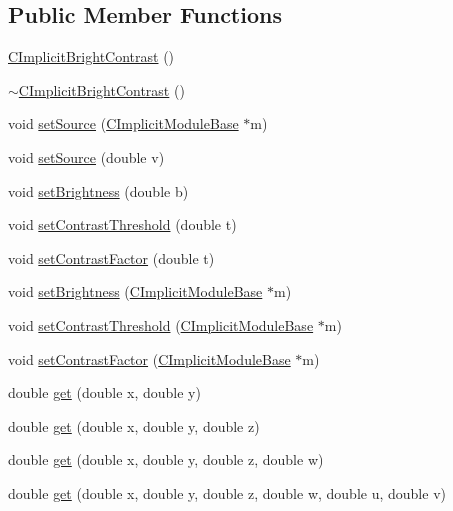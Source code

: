 \subsection*{Public Member Functions}
\begin{DoxyCompactItemize}
\item 
\hyperlink{classanl_1_1CImplicitBrightContrast_abc96d388571ee3f9cd77aeb5a9988661}{CImplicitBrightContrast} ()
\item 
\hyperlink{classanl_1_1CImplicitBrightContrast_aaa74e84e46905bb5eb1c9c4449c80a95}{$\sim$CImplicitBrightContrast} ()
\item 
void \hyperlink{classanl_1_1CImplicitBrightContrast_a3410a8ee63c6a39d4ee4a89525374bef}{setSource} (\hyperlink{classanl_1_1CImplicitModuleBase}{CImplicitModuleBase} $\ast$m)
\item 
void \hyperlink{classanl_1_1CImplicitBrightContrast_aaa62e32b549b7cdb28a167b6b46b0221}{setSource} (double v)
\item 
void \hyperlink{classanl_1_1CImplicitBrightContrast_aa996e46743f6045cbae0eba7bcdb5f41}{setBrightness} (double b)
\item 
void \hyperlink{classanl_1_1CImplicitBrightContrast_a7d6a2ed8330e8974f965a29dc9f7170f}{setContrastThreshold} (double t)
\item 
void \hyperlink{classanl_1_1CImplicitBrightContrast_a91df65732ee76a344ea5bfccb4e3733a}{setContrastFactor} (double t)
\item 
void \hyperlink{classanl_1_1CImplicitBrightContrast_aedca3e206e044ba89d43e1768079f1ec}{setBrightness} (\hyperlink{classanl_1_1CImplicitModuleBase}{CImplicitModuleBase} $\ast$m)
\item 
void \hyperlink{classanl_1_1CImplicitBrightContrast_a47379f5975f848fa306309be7abb15f9}{setContrastThreshold} (\hyperlink{classanl_1_1CImplicitModuleBase}{CImplicitModuleBase} $\ast$m)
\item 
void \hyperlink{classanl_1_1CImplicitBrightContrast_a556e2ce291391f68988c9ceb1dbf977e}{setContrastFactor} (\hyperlink{classanl_1_1CImplicitModuleBase}{CImplicitModuleBase} $\ast$m)
\item 
double \hyperlink{classanl_1_1CImplicitBrightContrast_a8b6d690936515565c8147eddcb2adbee}{get} (double x, double y)
\item 
double \hyperlink{classanl_1_1CImplicitBrightContrast_a545704ba2a73a8b58e5e07751a706f3a}{get} (double x, double y, double z)
\item 
double \hyperlink{classanl_1_1CImplicitBrightContrast_a8b2497875f7c2d22cc723673358c3463}{get} (double x, double y, double z, double w)
\item 
double \hyperlink{classanl_1_1CImplicitBrightContrast_afeb937d994d492fa69cbbe61bdc8adfc}{get} (double x, double y, double z, double w, double u, double v)
\end{DoxyCompactItemize}
